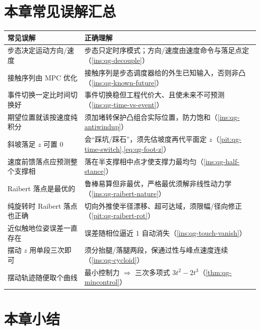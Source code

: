 \section*{本章常见误解汇总}
\begin{table}[H]\centering\small
\begin{tabular}{p{} p{}}
\toprule
\textbf{常见误解} & \textbf{正确理解} \\
\midrule
步态决定运动方向/速度 & 步态只定时序模式；方向/速度由速度命令与落足点定（\cref{ins:qg-decouple}）\\
接触序列由 MPC 优化 & 接触序列是步态调度器给的外生已知输入，否则非凸（\cref{ins:qg-known-future}）\\
事件切换一定比时间切换好 & 事件切换稳但工程代价大、且使未来不可预测（\cref{ins:qg-time-vs-event}）\\
期望位置就该按速度纯积分 & 须加堵转保护凸组合实际位置，防力饱和（\cref{ins:qg-antiwindup}）\\
斜坡落足 $z$ 可置 $0$ & 会“踩坑/踩石”，须先估坡度再代平面定 $z$（\cref{pit:qg-time-switch},\cref{eq:qg-foot-z}）\\
速度前馈落点应预测整个支撑相 & 落在半支撑相中点才使支撑力最均匀（\cref{ins:qg-half-stance}）\\
Raibert 落点是最优的 & 鲁棒易算但非最优，严格最优须解非线性动力学（\cref{ins:qg-raibert-nature}）\\
纯旋转时 Raibert 落点也正确 & 切向外推使半径漂移、超可达域，须限幅/径向修正（\cref{pit:qg-raibert-rot}）\\
近似触地位姿误差一直存在 & 误差随相位逼近 $1$ 自动消失（\cref{ins:qg-touch-vanish}）\\
摆动 $z$ 用单段三次即可 & 须分抬腿/落腿两段，保通过性与峰点速度连续（\cref{ins:qg-cycloid}）\\
摆动轨迹随便取个曲线 & 最小控制力 $\Rightarrow$ 三次多项式 $3t^2-2t^3$（\cref{thm:qg-mincontrol}）\\
\bottomrule
\end{tabular}
\end{table}

\section*{本章小结}

